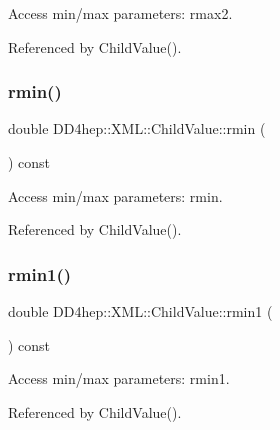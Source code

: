 Access min/max parameters\+: rmax2. 



Referenced by Child\+Value().

\hypertarget{struct_d_d4hep_1_1_x_m_l_1_1_child_value_a15b1bef40c8a880cce4a5e51d26249ab}{}\label{struct_d_d4hep_1_1_x_m_l_1_1_child_value_a15b1bef40c8a880cce4a5e51d26249ab} 
\subsubsection{\texorpdfstring{rmin()}{rmin()}}
{\footnotesize\ttfamily double D\+D4hep\+::\+X\+M\+L\+::\+Child\+Value\+::rmin (\begin{DoxyParamCaption}{ }\end{DoxyParamCaption}) const}



Access min/max parameters\+: rmin. 



Referenced by Child\+Value().

\hypertarget{struct_d_d4hep_1_1_x_m_l_1_1_child_value_adae8e9c99ec8da854424895bc2cbf7ed}{}\label{struct_d_d4hep_1_1_x_m_l_1_1_child_value_adae8e9c99ec8da854424895bc2cbf7ed} 
\subsubsection{\texorpdfstring{rmin1()}{rmin1()}}
{\footnotesize\ttfamily double D\+D4hep\+::\+X\+M\+L\+::\+Child\+Value\+::rmin1 (\begin{DoxyParamCaption}{ }\end{DoxyParamCaption}) const}



Access min/max parameters\+: rmin1. 



Referenced by Child\+Value().

\hypertarget{struct_d_d4hep_1_1_x_m_l_1_1_child_value_a57b93bc900475dbfc6ab42b6c4cf5c89}{}\label{struct_d_d4hep_1_1_x_m_l_1_1_child_value_a57b93bc900475dbfc6ab42b6c4cf5c89} 
